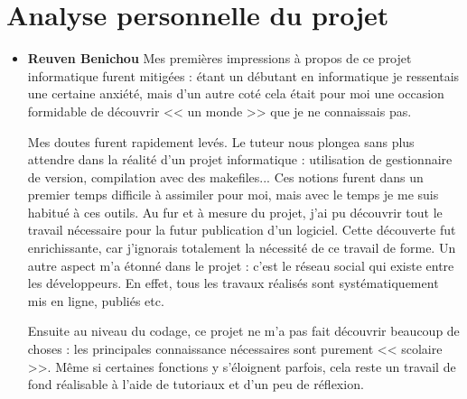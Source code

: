 \chapter{Analyse personnelle du projet}

\begin{itemize}
\item [\textbullet] \Large \textbf{Reuven Benichou}
\newline
\normalsize
Mes premi\`eres impressions \`a propos de ce projet informatique furent mitig\'ees : \'etant un d\'ebutant en informatique je ressentais une certaine anxi\'et\'e, mais d'un autre cot\'e cela \'etait pour moi une occasion formidable de d\'ecouvrir << un monde >> que je ne connaissais pas.

Mes doutes furent rapidement lev\'es. Le tuteur nous plongea sans plus attendre dans la r\'ealit\'e d'un projet informatique : utilisation de gestionnaire de version, compilation avec des makefiles...
Ces notions furent dans un premier temps difficile \`a assimiler pour moi, mais avec le temps je me suis habitu\'e \`a ces outils. Au fur et \`a mesure du projet,  j'ai pu d\'ecouvrir tout le travail n\'ecessaire pour la futur publication d'un logiciel. Cette d\'ecouverte fut enrichissante, car j'ignorais totalement la n\'ecessit\'e de ce travail de forme. Un autre aspect m'a \'etonn\'e dans le projet : c'est le r\'eseau social qui existe entre les d\'eveloppeurs. En effet, tous les travaux r\'ealis\'es sont syst\'ematiquement mis en ligne, publi\'es etc. 

Ensuite au niveau du codage, ce projet ne m'a pas fait d\'ecouvrir beaucoup de choses : les principales connaissance n\'ecessaires sont purement 
<< scolaire >>. M\^eme si certaines fonctions y s'\'eloignent parfois, cela reste un travail de fond r\'ealisable \`a l'aide de tutoriaux et d'un peu de r\'eflexion.


\end{itemize}
